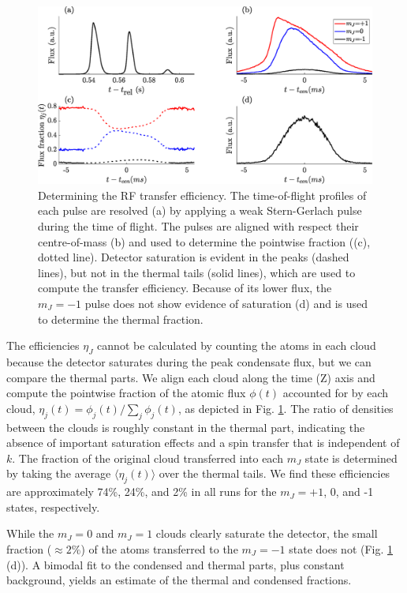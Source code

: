 \begin{figure}[!t]
	\begin{center}
		\includegraphics[width=\textwidth]{fig/QD/frac_cal_profile}
		\caption{Determining the RF transfer efficiency. The time-of-flight profiles of each pulse are resolved (a) by applying a weak Stern-Gerlach pulse during the time of flight. The pulses are aligned with respect their centre-of-mass (b) and used to determine the pointwise fraction ((c), dotted line). Detector saturation is evident in the peaks (dashed lines), but not in the thermal tails (solid lines), which are used to compute the transfer efficiency. Because of its lower flux, the $m_J=-1$ pulse does not show evidence of saturation (d) and is used to determine the thermal fraction.}
		\label{fig:frac_cal}
	\end{center}
	\end{figure}

	The efficiencies $\eta_J$ cannot be calculated by counting the atoms in each cloud because the detector saturates during the peak condensate flux, but we can compare the thermal parts. We align each cloud along the time (Z) axis and compute the pointwise fraction of the atomic flux $\phi(t)$ accounted for by each cloud, $\eta_j(t) = \phi_j(t)/\sum_j\phi_j(t)$, as depicted in Fig. \ref{fig:frac_cal}. The ratio of densities between the clouds is roughly constant in the thermal part, indicating the absence of important saturation effects and a spin transfer that is independent of $k$. The fraction of the original cloud transferred into each $m_J$ state is determined by taking the average $\langle\eta_j(t)\rangle$ over the thermal tails. We find these efficiencies are approximately 74\%, 24\%, and 2\% in all runs for the $m_J=+1$, 0, and -1 states, respectively.
	
	While the $m_J=0$ and $m_J=1$ clouds clearly saturate the detector, the small fraction ($\approx2\%$) of the atoms transferred to the $m_J=-1$ state does not (Fig. \ref{fig:frac_cal} (d)). A bimodal fit to the condensed and thermal parts, plus constant background, yields an estimate of the thermal and condensed fractions.
	


